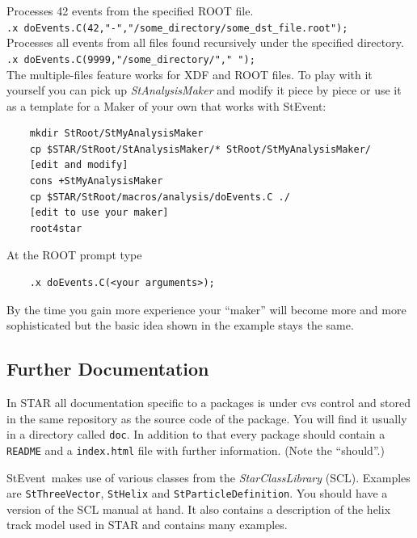 \documentclass[twoside]{article}
\newcommand{\name}[1]{\textsl{#1}}%
\newcommand{\StEvent}{\textsf{StEvent}}
\begin{document}
Processes 42 events from the specified ROOT file.\\
\hspace{1cm}\verb+.x doEvents.C(42,"-","/some_directory/some_dst_file.root");+\\

Processes all events from all files found recursively under the
specified directory.\\
\verb+.x doEvents.C(9999,"/some_directory/"," ");+\\

The multiple-files feature works for XDF and ROOT files.  To play with
it yourself you can pick up \name{StAnalysisMaker} and modify it piece
by piece or use it as a template for a Maker of your own that works
with \StEvent:

\begin{verbatim}
    mkdir StRoot/StMyAnalysisMaker
    cp $STAR/StRoot/StAnalysisMaker/* StRoot/StMyAnalysisMaker/
    [edit and modify]
    cons +StMyAnalysisMaker
    cp $STAR/StRoot/macros/analysis/doEvents.C ./
    [edit to use your maker]
    root4star
\end{verbatim}
At the ROOT prompt type
\begin{verbatim}
    .x doEvents.C(<your arguments>);
\end{verbatim}
By the time you gain more experience your ``maker'' will become more
and more sophisticated but the basic idea shown in the example stays
the same.

\subsection{Further Documentation}
\label{sec:furtherDoc}

In STAR all documentation specific to a packages is under cvs control
and stored in the same repository as the source code of the package.
You will find it usually in a directory called \texttt{doc}.  In
addition to that every package should contain a \texttt{README} and a
\texttt{index.html} file with further information. (Note the
``should''.)

\StEvent\ makes use of various classes from the
\name{StarClassLibrary} (SCL).  Examples are \texttt{StThreeVector},
\texttt{StHelix} and \texttt{StParticleDefinition}. You should have a
version of the SCL manual at hand. It also contains a description of
the helix track model used in STAR and contains many
examples. 
\end{document}
